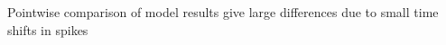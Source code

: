 \documentclass[presentation]{beamer}
\begin{document}









\begin{frame}{Pointwise comparison of model results give large differences
  due to small time shifts in spikes}
  \vspace{-2mm}
  \begin{figure}

\end{figure}
\end{frame}
\end{document}
